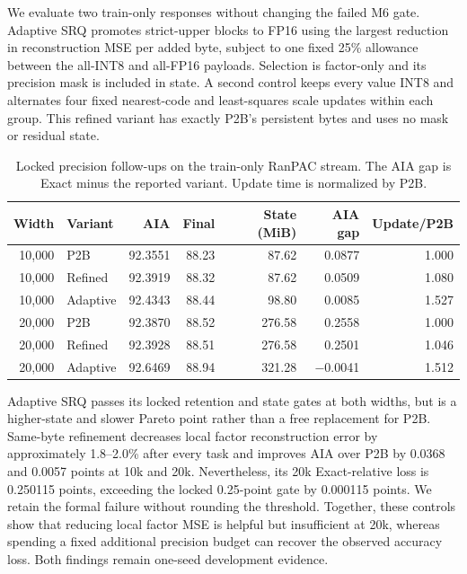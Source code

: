 \documentclass[runningheads]{llncs}
\begin{document}
We evaluate two train-only responses without changing the failed M6 gate.
Adaptive SRQ promotes strict-upper blocks to FP16 using the largest reduction
in reconstruction MSE per added byte, subject to one fixed 25\% allowance
between the all-INT8 and all-FP16 payloads. Selection is factor-only and its
precision mask is included in state. A second control keeps every value INT8
and alternates four fixed nearest-code and least-squares scale updates within
each group. This refined variant has exactly P2B's persistent bytes and uses no
mask or residual state.

\begin{table}
\caption{Locked precision follow-ups on the train-only RanPAC stream. The AIA
gap is Exact minus the reported variant. Update time is normalized by P2B.}
\label{tab:precision-followup}
\centering
\small
\begin{tabular}{rlrrrrr}
\toprule
Width & Variant & AIA & Final & State (MiB) & AIA gap & Update/P2B \\
\midrule
10,000 & P2B      & 92.3551 & 88.23 & 87.62  & 0.0877 & 1.000 \\
10,000 & Refined  & 92.3919 & 88.32 & 87.62  & 0.0509 & 1.080 \\
10,000 & Adaptive & 92.4343 & 88.44 & 98.80  & 0.0085 & 1.527 \\
20,000 & P2B      & 92.3870 & 88.52 & 276.58 & 0.2558 & 1.000 \\
20,000 & Refined  & 92.3928 & 88.51 & 276.58 & 0.2501 & 1.046 \\
20,000 & Adaptive & 92.6469 & 88.94 & 321.28 & $-$0.0041 & 1.512 \\
\bottomrule
\end{tabular}
\end{table}

Adaptive SRQ passes its locked retention and state gates at both widths, but
is a higher-state and slower Pareto point rather than a free replacement for
P2B. Same-byte refinement decreases local factor reconstruction error by
approximately 1.8--2.0\% after every task and improves AIA over P2B by 0.0368
and 0.0057 points at 10k and 20k. Nevertheless, its 20k Exact-relative loss is
0.250115 points, exceeding the locked 0.25-point gate by 0.000115 points. We
retain the formal failure without rounding the threshold. Together, these
controls show that reducing local factor MSE is helpful but insufficient at
20k, whereas spending a fixed additional precision budget can recover the
observed accuracy loss. Both findings remain one-seed development evidence.
\end{document}
